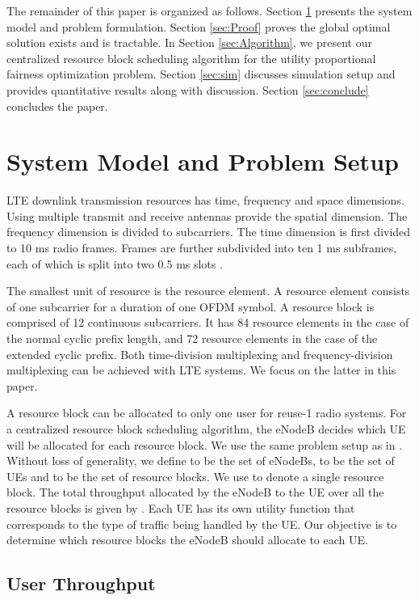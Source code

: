 \documentclass[conference]{IEEEtran}
\begin{document}
The remainder of this paper is organized as follows. Section \ref{sec:Problem_formulation} presents the system model and problem formulation. Section \ref{sec:Proof} proves the global optimal solution exists and is tractable. In Section \ref{sec:Algorithm}, we present our centralized resource block scheduling algorithm for the utility proportional fairness optimization problem. Section \ref{sec:sim} discusses simulation setup and provides quantitative results along with discussion. Section \ref{sec:conclude} concludes the paper.

\section{System Model and Problem Setup}\label{sec:Problem_formulation}
LTE downlink transmission resources has time, frequency and space dimensions. Using multiple transmit and receive antennas provide the spatial dimension. The frequency dimension is divided to subcarriers. The time dimension is first divided to 10 ms radio frames. Frames are further subdivided into ten 1 ms subframes, each of which is split into two 0.5 ms slots \cite{LTEBook}. 

The smallest unit of resource is the resource element. A resource element consists of one subcarrier for a duration of one OFDM symbol. A resource block is comprised of 12 continuous subcarriers. It has 84 resource elements in the case of the normal cyclic prefix length, and 72 resource elements in the case of the extended cyclic prefix. Both time-division multiplexing and frequency-division multiplexing can be achieved with LTE systems. We focus on the latter in this paper. 

A resource block can be allocated to only one user for reuse-1 radio systems. For a centralized resource block scheduling algorithm, the eNodeB decides which UE will be allocated for each resource block. We use the same problem setup as in \cite{SelfOrganizedLTE}. Without loss of generality, we define  to be the set of eNodeBs,  to be the set of UEs and  to be the set of resource blocks. We use  to denote a single resource block. The total throughput allocated by the eNodeB to the  UE over all the resource blocks is given by . Each UE has its own utility function  that corresponds to the type of traffic being handled by the UE. Our objective is to determine which resource blocks the eNodeB should allocate to each UE. 

\subsection{User Throughput}\label{sec:throughput}
\end{document}
